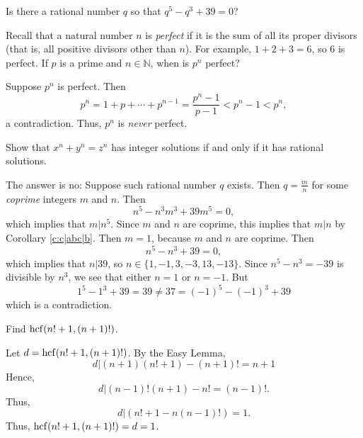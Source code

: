 \documentclass[11pt,dvipsnames]{book}
\def\hcf{{\rm hcf}}
\numberwithin{equation}{section} %
\numberwithin{figure}{section} %
\numberwithin{table}{section} %
\begin{document}
\begin{exercise} Is there a rational number $q$ so that $q^{5}-q^{3}+39=0$?

\end{exercise}


\begin{exercise} Recall that a natural number $n$ is {\it perfect} if it is the sum of all its proper divisors (that is, all positive divisors other than $n$). For example, $1 + 2 + 3 = 6$, so $6$ is perfect. If $p$ is a prime and $n\in\mathbb{N}$, when is $p^{n}$ perfect? 

\begin{solution}
Suppose $p^{n}$ is perfect. Then
\[
p^{n} = 1+p+\cdots + p^{n-1} = \frac{p^{n}-1}{p-1}<p^{n}-1<p^{n},
\]
a contradiction. Thus, $p^{n}$ is {\it never} perfect.
\end{solution}

\end{exercise}


\begin{exercise} Show that $x^{n}+y^{n}=z^{n}$ has integer solutions if and only if it has rational solutions. 

\begin{solution}
 The answer is no: Suppose such rational number $q$ exists. Then $q=\frac{m}{n}$ for some {\it coprime} integers $m$ and $n$. Then
\[
n^5 − n^3m^3 + 39m^5 = 0,\]
which implies that $m|n^5$. Since $m$ and $n$ are coprime, this implies
that $m|n$ by Corollary \ref{c:c|abc|b}. Then $m = 1$, because $m$ and $n$ are coprime. Then
\[
n^5 −n^3 +39=0,
\]
which implies that $n| 39$, so $n\in \{1, −1, 3, −3, 13, −13\}$. Since
$n^5 − n^3 = −39$  is divisible by $n^3$, we see that either $n=1$ or $n=−1$. But
\[1^{5}-1^3+39=39\neq 37 = (-1)^{5}-(-1)^{3}+39\]
which is a contradiction.
\end{solution}


\end{exercise}


\begin{exercise} Find $\hcf(n!+1,(n+1)!)$. 

\begin{solution}
Let $d=\hcf(n!+1,(n+1)!)$. By the Easy Lemma,
\[
d| (n+1)(n!+1)-(n+1)! = n+1
\]
Hence,
\[
d| (n-1)!(n+1)-n! = (n-1)!.
\]
Thus,
\[
d|(n! +1 - n(n-1)!)=1.
\]
Thus, $\hcf(n!+1,(n+1)!)=d=1$.
\end{solution}


\end{exercise}
\end{document}
